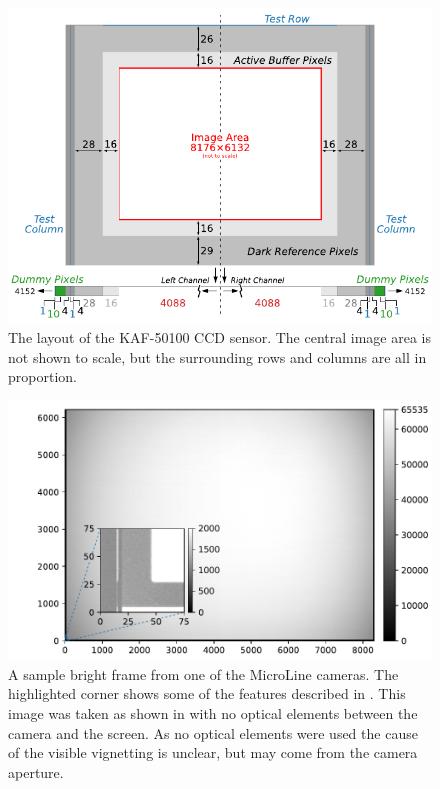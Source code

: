 \begin{colsection}
\begin{figure}[p]
    \begin{center}
        \includegraphics[width=0.78\linewidth]{images/chip}
    \end{center}
    \caption[The layout of the KAF-50100 CCD sensor]{
        The layout of the KAF-50100 CCD sensor. The central image area is not shown to scale, but the surrounding rows and columns are all in proportion.
    }\label{fig:chip}
\end{figure}

\begin{figure}[p]
    \begin{center}
        \includegraphics[width=0.78\linewidth]{images/sample3.pdf}
    \end{center}
    \caption[A sample bright frame from one of the MicroLine cameras]{
        A sample bright frame from one of the MicroLine cameras. The highlighted corner shows some of the features described in . This image was taken as shown in  with no optical elements between the camera and the screen. As no optical elements were used the cause of the visible vignetting is unclear, but may come from the camera aperture.
    }\label{fig:frame}
\end{figure}

\clearpage
\newpage

\end{colsection}


